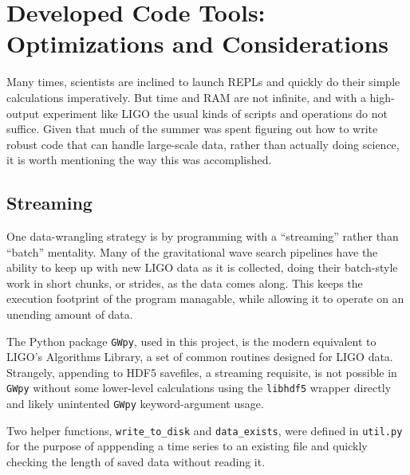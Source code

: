 \documentclass[colorlinks=true,pdfstartview=FitV,linkcolor=blue,
            citecolor=red,urlcolor=magenta]{ligodoc}
\begin{document}
\section{Developed Code Tools: Optimizations and Considerations}
Many times, scientists are inclined to launch REPLs and quickly do their simple calculations imperatively.
But time and RAM are not infinite, and with a high-output experiment like LIGO the usual kinds of scripts and operations do not suffice.
Given that much of the summer was spent figuring out how to write robust code that can handle large-scale data, rather than actually doing science, it is worth mentioning the way this was accomplished.

\subsection{Streaming}
One data-wrangling strategy is by programming with a ``streaming'' rather than ``batch'' mentality.
Many of the gravitational wave search pipelines have the ability to keep up with new LIGO data as it is collected, doing their batch-style work in short chunks, or strides, as the data comes along.
This keeps the execution footprint of the program managable, while allowing it to operate on an unending amount of data.

The Python package \texttt{GWpy}, used in this project, is the modern equivalent to LIGO's Algorithms Library, a set of common routines designed for LIGO data.
Strangely, appending to HDF5 savefiles, a streaming requisite, is not possible in \texttt{GWpy} without some lower-level calculations using the \texttt{libhdf5} wrapper directly and likely unintented \texttt{GWpy} keyword-argument usage.

Two helper functions, \texttt{write\_to\_disk} and \texttt{data\_exists}, were defined in \texttt{util.py} for the purpose of apppending a time series to an existing file and quickly checking the length of saved data without reading it.
\end{document}
